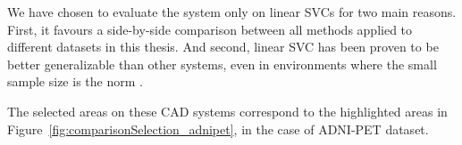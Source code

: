 We have chosen to evaluate the system only on linear \acp{SVC} for two main reasons. First, it favours a side-by-side comparison between all methods applied to different datasets in this thesis. And second, linear \ac{SVC} has been proven to be better generalizable than other systems, even in environments where the small sample size is the norm \cite{Vapnik1997}. 

The selected areas on these \ac{CAD} systems correspond to the highlighted areas in Figure~\ref{fig:comparisonSelection_adnipet}, in the case of ADNI-PET dataset. 

\begin{figure}[bth]
	\myfloatalign
	\quad
	\subfloat[\ac{KL} divergence.]

\end{figure}
